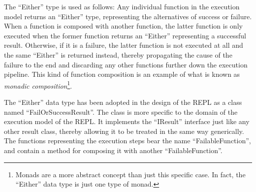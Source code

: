 The ``Either'' type is used as follows: Any individual function in the
execution model returns an ``Either'' type, representing the
alternatives of success or failure. When a function is composed with
another function, the latter function is only executed when the former
function returns an ``Either'' representing a successful
result. Otherwise, if it is a failure, the latter function is not
executed at all and the same ``Either'' is returned instead, thereby
propagating the cause of the failure to the end and discarding any
other functions further down the execution pipeline. This kind of
function composition is an example of what is known as \textit{monadic
  composition}\footnote{Monads are a more abstract concept than just
  this specific case. In fact, the ``Either'' data type is just one
  type of monad.}.

The ``Either'' data type has been adopted in the design of the REPL as
a class named ``FailOrSuccessResult''. The class is more specific to
the domain of the execution model of the REPL. It implements the
``IResult'' interface just like any other result class, thereby
allowing it to be treated in the same way generically. The functions
representing the execution steps bear the name ``FailableFunction'',
and contain a method for composing it with another
``FailableFunction''.

